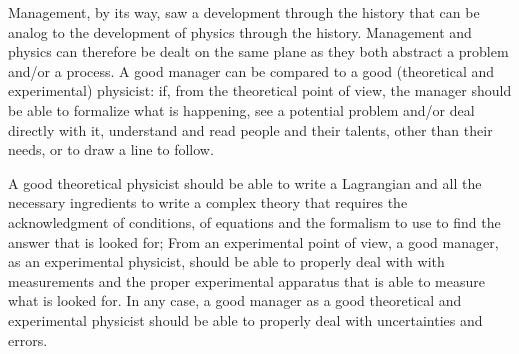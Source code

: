\documentclass{article}
\begin{document}
Management, by its way, saw a development through the history that can be analog to the development of physics through the history. Management and physics can therefore be dealt on the same plane as they both abstract a problem and/or a process. A good manager can be compared to a good (theoretical and experimental) physicist:
if, from the theoretical point of view, the manager should be able to formalize what is happening, see a potential problem and/or deal directly with it, understand and read people and their talents, other than their needs, or to draw a line to follow. 

A good theoretical physicist should be able to write a Lagrangian and all the necessary ingredients to write a complex theory that requires the acknowledgment of conditions, of equations and the formalism to use to find the answer that is looked for; From an experimental point of view, a good manager, as an experimental physicist, should be able to properly deal with with measurements and the proper experimental apparatus that is able to measure what is looked for. In any case, a good manager as a good theoretical and experimental physicist should be able to properly deal with uncertainties and errors.
\end{document}
